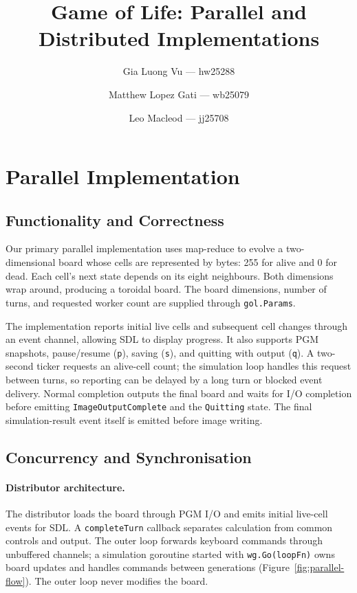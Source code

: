 \documentclass[10pt,a4paper,twocolumn]{article}
\title{Game of Life: Parallel and Distributed Implementations}
\author{Gia Luong Vu --- hw25288 \and Matthew Lopez Gati --- wb25079 \and  Leo Macleod --- jj25708}
\date{}
\begin{document}
\maketitle
\RaggedRight

\section{Parallel Implementation}

\subsection{Functionality and Correctness}

Our primary parallel implementation uses map-reduce to evolve a two-dimensional
board whose cells are represented by bytes: 255 for alive and 0 for dead.
Each cell's next state depends on its eight neighbours. Both dimensions wrap
around, producing a toroidal board. The board dimensions, number of turns,
and requested worker count are supplied through \texttt{gol.Params}.

The implementation reports initial live cells and subsequent cell changes
through an event channel, allowing SDL to display progress. It also supports
PGM snapshots, pause/resume (\texttt{p}), saving (\texttt{s}), and quitting
with output (\texttt{q}). A two-second ticker requests an alive-cell count;
the simulation loop handles this request between turns, so reporting can be
delayed by a long turn or blocked event delivery. Normal completion outputs
the final board and waits for I/O completion before emitting
\texttt{ImageOutputComplete} and the \texttt{Quitting} state. The final
simulation-result event itself is emitted before image writing.

\subsection{Concurrency and Synchronisation}

\paragraph{Distributor architecture.}
The distributor loads the board through PGM I/O and emits initial live-cell
events for SDL. A \texttt{completeTurn} callback separates calculation from
common controls and output. The outer loop forwards keyboard commands through
unbuffered channels; a simulation goroutine started with \texttt{wg.Go(loopFn)}
owns board updates and handles commands between generations
(Figure~\ref{fig:parallel-flow}). The outer loop never modifies the board.
\end{document}
